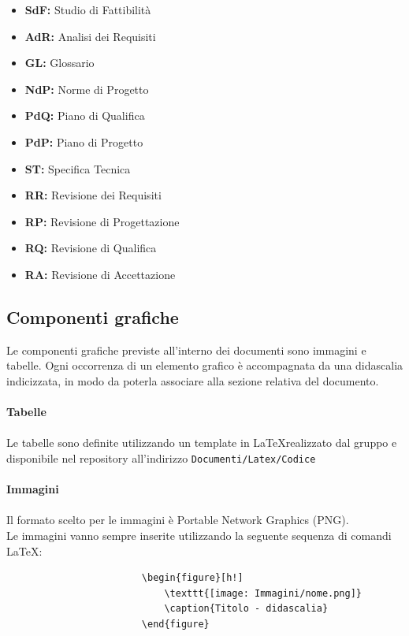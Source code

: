 \documentclass[a4paper]{report}
\begin{document}
				\begin{itemize}
					\item \textbf{SdF:} Studio di Fattibilità
					\item \textbf{AdR:} Analisi dei Requisiti
					\item \textbf{GL:} Glossario
					\item \textbf{NdP:} Norme di Progetto
					\item \textbf{PdQ:} Piano di Qualifica
					\item \textbf{PdP:} Piano di Progetto
					\item \textbf{ST:} Specifica Tecnica
					\item \textbf{RR:} Revisione dei Requisiti
					\item \textbf{RP:} Revisione di Progettazione
					\item \textbf{RQ:} Revisione di Qualifica
					\item \textbf{RA:} Revisione di Accettazione
				\end{itemize}
			\subsection{Componenti grafiche}
				Le componenti grafiche previste all'interno dei documenti sono immagini e tabelle. Ogni occorrenza di un
				 elemento grafico è accompagnata da una didascalia indicizzata, in modo da poterla associare alla sezione 
				 relativa del documento. \\ \\
				\textbf{Tabelle} \\ \\ 
					Le tabelle sono definite utilizzando un template in \LaTeX \space realizzato dal gruppo e disponibile nel 
					repository all'indirizzo \verb|Documenti/Latex/Codice| \\ \\ 
				\textbf{Immagini}  \\ \\
					Il formato scelto per le immagini è Portable Network Graphics (PNG). \\
					Le immagini vanno sempre inserite utilizzando la seguente sequenza di comandi \LaTeX:
					\begin{verbatim}
						\begin{figure}[h!]
							\texttt{[image: Immagini/nome.png]}
							\caption{Titolo - didascalia}
						\end{figure}
					\end{verbatim}
\end{document}
